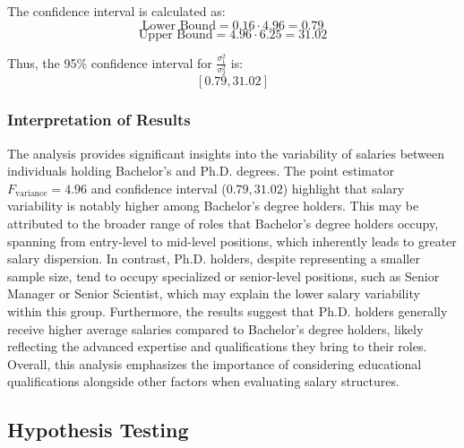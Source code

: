 \documentclass[12pt,a4paper]{article}
\begin{document}
The confidence interval is calculated as:
\[
\text{Lower Bound} = 0.16 \cdot 4.96  = 0.79
\]
\[
\text{Upper Bound} = 4.96 \cdot 6.25 = 31.02
\]

Thus, the 95\% confidence interval for \( \frac{\sigma_1^2}{\sigma_2^2} \) is:
\[
[0.79, 31.02]
\]

\subsubsection*{Interpretation of Results}


The analysis provides significant insights into the variability of salaries between individuals holding Bachelor's and Ph.D. degrees. The point estimator \( F_{\text{variance}} = 4.96 \) and confidence interval (\( 0.79, 31.02 \)) highlight that salary variability is notably higher among Bachelor's degree holders. This may be attributed to the broader range of roles that Bachelor's degree holders occupy, spanning from entry-level to mid-level positions, which inherently leads to greater salary dispersion. In contrast, Ph.D. holders, despite representing a smaller sample size, tend to occupy specialized or senior-level positions, such as Senior Manager or Senior Scientist, which may explain the lower salary variability within this group. Furthermore, the results suggest that Ph.D. holders generally receive higher average salaries compared to Bachelor's degree holders, likely reflecting the advanced expertise and qualifications they bring to their roles. Overall, this analysis emphasizes the importance of considering educational qualifications alongside other factors when evaluating salary structures. 
\newpage






























\subsection{Hypothesis Testing}

\vspace{1em}
\end{document}
